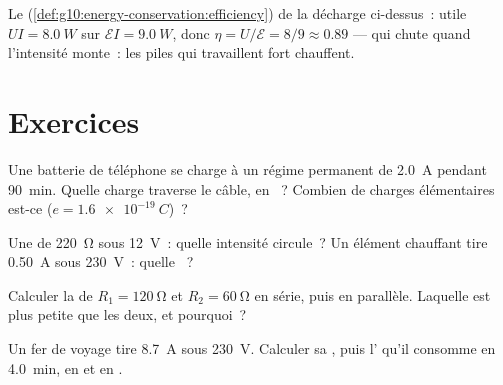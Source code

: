 \begin{example}\label{ex:g11:circuits-and-power:efficiency}
Le 
(\cref{def:g10:energy-conservation:efficiency}) de la décharge
ci-dessus~: utile $UI = \qty{8.0}{W}$ sur $\mathcal{E}I =
\qty{9.0}{W}$, donc $\eta = U/\mathcal{E} = 8/9 \approx 0.89$ ---
qui chute quand l'intensité monte~: les piles qui travaillent fort
chauffent.
\end{example}

\section{Exercices}

\begin{exercise}[$\star$]\label{exo:g11:circuits-and-power:1}
Une batterie de téléphone se charge à un régime permanent de
\qty{2.0}{A} pendant \qty{90}{min}. Quelle charge traverse le câble, en
~? Combien de charges élémentaires
est-ce ($e = \qty{1.6e-19}{C}$)~?
\end{exercise}

\begin{exercise}[$\star$]\label{exo:g11:circuits-and-power:2}
Une  de \qty{220}{\ohm} sous \qty{12}{V}~: quelle intensité
circule~? Un élément chauffant tire \qty{0.50}{A} sous \qty{230}{V}~:
quelle ~?
\end{exercise}

\begin{exercise}[$\star$]\label{exo:g11:circuits-and-power:3}
Calculer la  de
$R_1 = \qty{120}{\ohm}$ et $R_2 = \qty{60}{\ohm}$ en série, puis en
parallèle. Laquelle est plus petite que les deux, et pourquoi~?
\end{exercise}

\begin{exercise}[$\star$]\label{exo:g11:circuits-and-power:4}
Un fer de voyage tire \qty{8.7}{A} sous \qty{230}{V}. Calculer sa
, puis
l' qu'il consomme en \qty{4.0}{min},
en  et en
.
\end{exercise}

